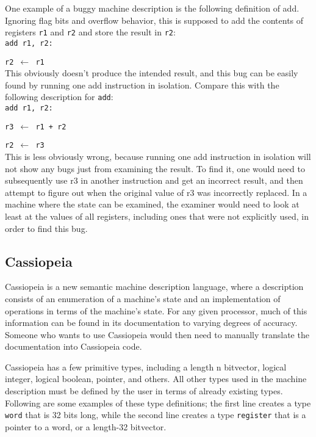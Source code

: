 \documentclass[letterpaper,12pt]{article}
\begin{document}
One example of a buggy machine description is the following definition of add. Ignoring flag bits and overflow behavior, this is supposed to add the contents of registers \texttt{r1} and \texttt{r2} and store the result in \texttt{r2}:\\

\texttt{add r1, r2:}

\texttt{r2 $\leftarrow$ r1}\\

This obviously doesn't produce the intended result, and this bug can be easily found by running one add instruction in isolation. Compare this with the following description for \texttt{add}:\\

\texttt{add r1, r2:}

\texttt{r3 $\leftarrow$ r1 + r2}

\texttt{r2 $\leftarrow$ r3}\\

This is less obviously wrong, because running one add instruction in isolation will not show any bugs just from examining the result. To find it, one would need to subsequently use r3 in another instruction and get an incorrect result, and then attempt to figure out when the original value of r3 was incorrectly replaced. In a machine where the state can be examined, the examiner would need to look at least at the values of all registers, including ones that were not explicitly used, in order to find this bug.

\subsection{Cassiopeia}

Cassiopeia is a new semantic machine description language, where a description consists of an enumeration of a machine's state and an implementation of operations in terms of the machine's state. For any given processor, much of this information can be found in its documentation to varying degrees of accuracy. Someone who wants to use Cassiopeia would then need to manually translate the documentation into Cassiopeia code.

Cassiopeia has a few primitive types, including a length n bitvector, logical integer, logical boolean, pointer, and others. All other types used in the machine description must be defined by the user in terms of already existing types. Following are some examples of these type definitions; the first line creates a type \texttt{word} that is 32 bits long, while the second line creates a type \texttt{register} that is a pointer to a word, or a length-32 bitvector.\\
\end{document}
